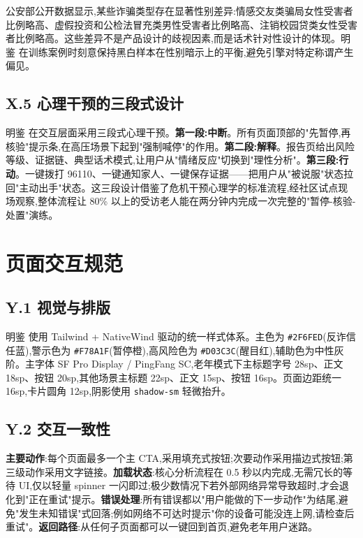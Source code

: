 \documentclass[UTF8,a4paper,12pt]{ctexart}
\begin{document}
公安部公开数据显示,某些诈骗类型存在显著性别差异:情感交友类骗局女性受害者比例略高、虚假投资和公检法冒充类男性受害者比例略高、注销校园贷类女性受害者比例略高。这些差异不是产品设计的歧视因素,而是话术针对性设计的体现。明鉴 在训练案例时刻意保持黑白样本在性别暗示上的平衡,避免引擎对特定称谓产生偏见。

\subsection*{X.5 心理干预的三段式设计}

明鉴 在交互层面采用三段式心理干预。\textbf{第一段:中断}。所有页面顶部的"先暂停,再核验"提示条,在高压场景下起到"强制喊停"的作用。\textbf{第二段:解释}。报告页给出风险等级、证据链、典型话术模式,让用户从"情绪反应"切换到"理性分析"。\textbf{第三段:行动}。一键拨打 96110、一键通知家人、一键保存证据——把用户从"被说服"状态拉回"主动出手"状态。这三段设计借鉴了危机干预心理学的标准流程,经社区试点现场观察,整体流程让 80\% 以上的受访老人能在两分钟内完成一次完整的"暂停-核验-处置"演练。

\section{页面交互规范}

\subsection*{Y.1 视觉与排版}

明鉴 使用 Tailwind + NativeWind 驱动的统一样式体系。主色为 \texttt{\#2F6FED}(反诈信任蓝),警示色为 \texttt{\#F78A1F}(暂停橙),高风险色为 \texttt{\#D03C3C}(醒目红),辅助色为中性灰阶。主字体 SF Pro Display / PingFang SC,老年模式下主标题字号 28sp、正文 18sp、按钮 20sp,其他场景主标题 22sp、正文 15sp、按钮 16sp。页面边距统一 16sp,卡片圆角 12sp,阴影使用 \texttt{shadow-sm} 轻微抬升。

\subsection*{Y.2 交互一致性}

\textbf{主要动作}:每个页面最多一个主 CTA,采用填充式按钮;次要动作采用描边式按钮;第三级动作采用文字链接。\textbf{加载状态}:核心分析流程在 0.5 秒以内完成,无需冗长的等待 UI,仅以轻量 spinner 一闪即过;极少数情况下若外部网络异常导致超时,才会退化到"正在重试"提示。\textbf{错误处理}:所有错误都以"用户能做的下一步动作"为结尾,避免"发生未知错误"式回落;例如网络不可达时提示"你的设备可能没连上网,请检查后重试"。\textbf{返回路径}:从任何子页面都可以一键回到首页,避免老年用户迷路。
\end{document}
